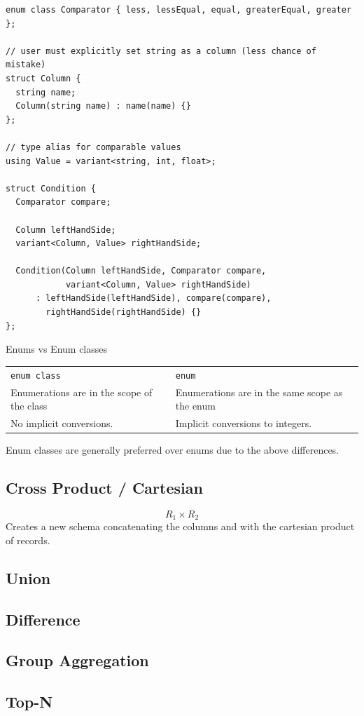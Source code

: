 \begin{verbatim}
enum class Comparator { less, lessEqual, equal, greaterEqual, greater };

// user must explicitly set string as a column (less chance of mistake)
struct Column {
  string name;
  Column(string name) : name(name) {}
};

// type alias for comparable values
using Value = variant<string, int, float>;

struct Condition {
  Comparator compare;

  Column leftHandSide;
  variant<Column, Value> rightHandSide;

  Condition(Column leftHandSide, Comparator compare,
            variant<Column, Value> rightHandSide)
      : leftHandSide(leftHandSide), compare(compare),
        rightHandSide(rightHandSide) {}
};
\end{verbatim}

\begin{sidenotebox}{Enums vs Enum classes}
  \begin{center}
    \begin{tabular}{p{} p{}}
      \centerline{\texttt{enum class}} & \centerline{\texttt{enum}} \\
      Enumerations are in the scope of the class & Enumerations are in the same scope as the enum \\
      No implicit conversions. & Implicit conversions to integers. \\ 
    \end{tabular}
  \end{center}
  Enum classes are generally preferred over enums due to the above differences. 
\end{sidenotebox}

\subsection{Cross Product / Cartesian}
\[R_1 \times R_2\]
Creates a new schema concatenating the columns and with the cartesian product of records.

\subsection{Union}

\subsection{Difference}

\subsection{Group Aggregation}

\subsection{Top-N}
\unfinished